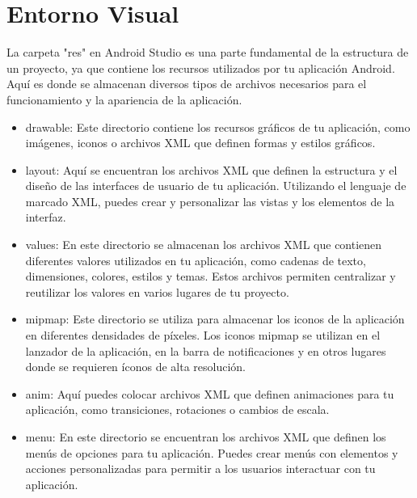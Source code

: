 \section{Entorno Visual}

 La carpeta "res" en Android Studio es una parte fundamental de la estructura de un proyecto, ya que contiene los recursos utilizados por tu aplicación Android. Aquí es donde se almacenan diversos tipos de archivos necesarios para el funcionamiento y la apariencia de la aplicación. 

\begin{itemize}
    \item  drawable: Este directorio contiene los recursos gráficos de tu aplicación, como imágenes, iconos o archivos XML que definen formas y estilos gráficos.
    \item layout: Aquí se encuentran los archivos XML que definen la estructura y el diseño de las interfaces de usuario de tu aplicación. Utilizando el lenguaje de marcado XML, puedes crear y personalizar las vistas y los elementos de la interfaz.
    \item values: En este directorio se almacenan los archivos XML que contienen diferentes valores utilizados en tu aplicación, como cadenas de texto, dimensiones, colores, estilos y temas. Estos archivos permiten centralizar y reutilizar los valores en varios lugares de tu proyecto.
    \item mipmap: Este directorio se utiliza para almacenar los iconos de la aplicación en diferentes densidades de píxeles. Los iconos mipmap se utilizan en el lanzador de la aplicación, en la barra de notificaciones y en otros lugares donde se requieren íconos de alta resolución.
    \item anim: Aquí puedes colocar archivos XML que definen animaciones para tu aplicación, como transiciones, rotaciones o cambios de escala.
    \item menu: En este directorio se encuentran los archivos XML que definen los menús de opciones para tu aplicación. Puedes crear menús con elementos y acciones personalizadas para permitir a los usuarios interactuar con tu aplicación.
\end{itemize}

